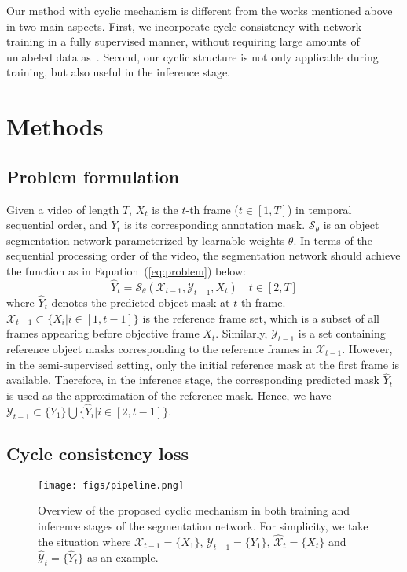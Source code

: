 \documentclass{article}
\begin{document}
Our method with cyclic mechanism is different from the works mentioned above in two main aspects. First, we incorporate cycle consistency with network training in a fully supervised manner, without requiring large amounts of unlabeled data as~\cite{CVPR2019_CycleTime}. Second, our cyclic structure is not only applicable during training, but also useful in the inference stage. 

\section{Methods}



\subsection{Problem formulation}
Given a video of length $T$, $X_t$ is the $t$-th frame ($t \in [1, T]$) in temporal sequential order, and $Y_t$ is its corresponding annotation mask. $\mathcal{S}_{\theta}$ is an object segmentation network parameterized by learnable weights $\theta$. In terms of the sequential processing order of the video, the segmentation network should achieve the function as in Equation~(\ref{eq:problem}) below:
\begin{equation}\label{eq:problem}
    \widehat{Y}_t = \mathcal{S}_{\theta}\left(\mathcal{X}_{t-1}, \mathcal{Y}_{t-1}, X_t \right) \quad t \in [2, T]
\end{equation}
where $\widehat{Y}_t$ denotes the predicted object mask at $t$-th frame. $\mathcal{X}_{t-1} \subset \{X_i | i \in [1, t-1]\}$ is the reference frame set, which is a subset of all frames appearing before objective frame $X_t$. Similarly, $\mathcal{Y}_{t-1}$ is a set containing reference object masks corresponding to the reference frames in $\mathcal{X}_{t-1}$. However, in the semi-supervised setting, only the initial reference mask at the first frame is available. Therefore, in the inference stage, the corresponding predicted mask $\widehat{Y}_t$ is used as the approximation of the reference mask. Hence, we have $\mathcal{Y}_{t-1} \subset \{Y_1\}\bigcup\{\widehat{Y}_i | i \in [2, t-1]\}$.

\subsection{Cycle consistency loss}
\begin{figure}
    \centering
    \texttt{[image: figs/pipeline.png]}
    \caption{Overview of the proposed cyclic mechanism in both training and inference stages of the segmentation network. For simplicity, we take the situation where $\mathcal{X}_{t-1}=\{X_1\}$, $\mathcal{Y}_{t-1}=\{Y_1\}$, $\widehat{\mathcal{X}}_t=\{X_t\}$ and $\widehat{\mathcal{Y}}_t=\{\widehat{Y}_t\}$ as an example.}
    \label{fig:framework}
\end{figure}
\end{document}
